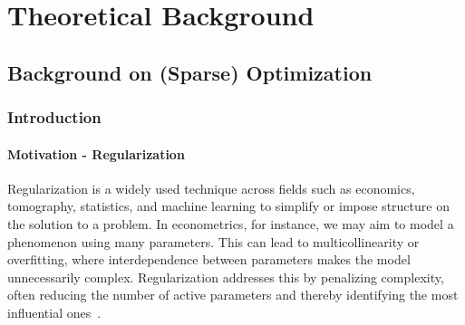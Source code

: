 \documentclass[11pt, twoside]{report}
\begin{document}
\part{Theoretical Background}
\chapter{Background on (Sparse) Optimization} \label{chp:sparse_background}
\section{Introduction}
\subsection{Motivation - Regularization}

Regularization is a widely used technique across fields such as economics, tomography, statistics, and machine learning to simplify or impose structure on the solution to a problem. In econometrics, for instance, we may aim to model a phenomenon using many parameters. This can lead to multicollinearity or overfitting, where interdependence between parameters makes the model unnecessarily complex. Regularization addresses this by penalizing complexity, often reducing the number of active parameters and thereby identifying the most influential ones~\cite{riskml}.
\end{document}
